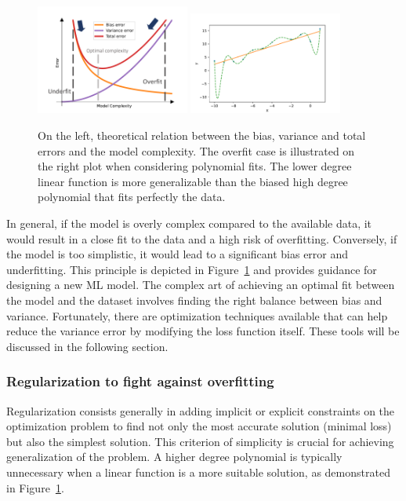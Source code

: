 \documentclass[main]{subfiles}
\begin{document}
\begin{figure}[ht]
  \centering
    \includegraphics[width=0.45\textwidth]{figures/4-ml/Bias_variance_tradeoff.pdf}
    \hfill
    \includegraphics[width=0.45\textwidth]{figures/4-ml/overfit.pdf}
    \caption{On the left, theoretical relation between the bias, variance and total errors and the model complexity. The overfit case is illustrated on the right plot when considering polynomial fits. The lower degree linear function is more generalizable than the biased high degree polynomial that fits perfectly the data.}\label{fgr:bias_variance}
\end{figure}

In general, if the model is overly complex compared to the available data, it would result in a close fit to the data and a high risk of overfitting. Conversely, if the model is too simplistic, it would lead to a significant bias error and underfitting. This principle is depicted in Figure~\ref{fgr:bias_variance} and provides guidance for designing a new ML model.
The complex art of achieving an optimal fit between the model and the dataset involves finding the right balance between bias and variance. Fortunately, there are optimization techniques available that can help reduce the variance error by modifying the loss function itself. These tools will be discussed in the following section.

\subsubsection{Regularization to fight against overfitting}

Regularization consists generally in adding implicit or explicit constraints on the optimization problem to find not only the most accurate solution (minimal loss) but also the simplest solution. This criterion of simplicity is crucial for achieving generalization of the problem. A higher degree polynomial is typically unnecessary when a linear function is a more suitable solution, as demonstrated in Figure~\ref{fgr:bias_variance}. 
\end{document}
